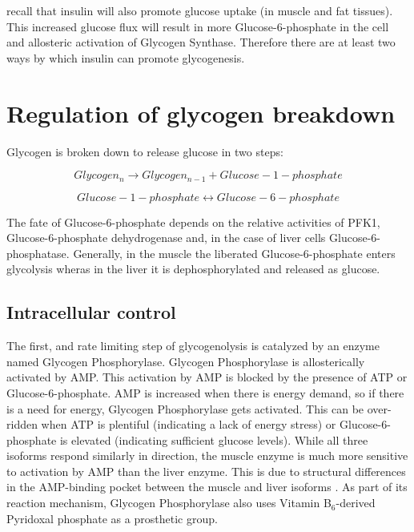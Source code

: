 \documentclass{tufte-handout}
\begin{document}
 recall that insulin will also promote glucose uptake (in muscle and fat tissues).  This increased glucose flux will result in more Glucose-6-phosphate in the cell and allosteric activation of Glycogen Synthase.  Therefore there are at least two ways by which insulin can promote glycogenesis.

\section{Regulation of glycogen breakdown}

Glycogen is broken down to release glucose in two steps:

\begin{equation}
Glycogen_{n} \rightarrow Glycogen_{n-1} + Glucose-1-phosphate
\end{equation}

\begin{equation}
Glucose-1-phosphate \leftrightarrow Glucose-6-phosphate
\end{equation}

The fate of Glucose-6-phosphate depends on the relative activities of PFK1, Glucose-6-phosphate dehydrogenase and, in the case of liver cells Glucose-6-phosphatase.  Generally, in the muscle the liberated Glucose-6-phosphate enters glycolysis wheras in the liver it is dephosphorylated and released as glucose.

\subsection{Intracellular control}

The first, and rate limiting step of glycogenolysis is catalyzed by an enzyme named Glycogen Phosphorylase.  Glycogen Phosphorylase is allosterically activated by AMP.  This activation by AMP is blocked by the presence of ATP or Glucose-6-phosphate.  AMP is increased when there is energy demand, so if there is a need for energy, Glycogen Phosphorylase gets activated.  This can be over-ridden when ATP is plentiful (indicating a lack of energy stress) or Glucose-6-phosphate is elevated (indicating sufficient glucose levels).  While all three isoforms respond similarly in direction, the muscle enzyme is much more sensitive to activation by AMP than the liver enzyme.  This is due to structural differences in the AMP-binding pocket between the muscle and liver isoforms \citep{Rath2000}.  As part of its reaction mechanism, Glycogen Phosphorylase also uses Vitamin B$_6$-derived Pyridoxal phosphate as a prosthetic group.
\end{document}

